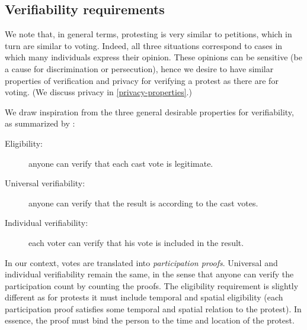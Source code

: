 \subsection{Verifiability requirements}%
\label{verifiability-properties}

We note that, in general terms, protesting is very similar to petitions, which in turn are similar to voting.
Indeed, all three situations correspond to cases in which many individuals express their opinion.
These opinions can be sensitive (\eg be a cause for discrimination or persecution), hence we desire to have similar properties of verification and privacy for verifying a protest as there are for voting.
(We discuss privacy in \cref{privacy-properties}.)

We draw inspiration from the three general desirable properties for 
verifiability, as summarized by 
\textcite{VerifyingPrivacyPropertiesOfVotingProtocols}:
\begin{description}
  \item[Eligibility:] anyone can verify that each cast vote is legitimate.
  \item[Universal verifiability:] anyone can verify that the result is according to the cast votes.
  \item[Individual verifiability:] each voter can verify that his vote is included in the result.
\end{description}
In our context, votes are translated into \emph{participation proofs}.
Universal and individual verifiability remain the same, in the sense that 
anyone can verify the participation count by counting the proofs.
The eligibility requirement is slightly different as for protests it must include temporal and spatial eligibility (\ie each participation proof satisfies some temporal and spatial relation to the protest).
In essence, the proof must bind the person to the time and location of the protest.

